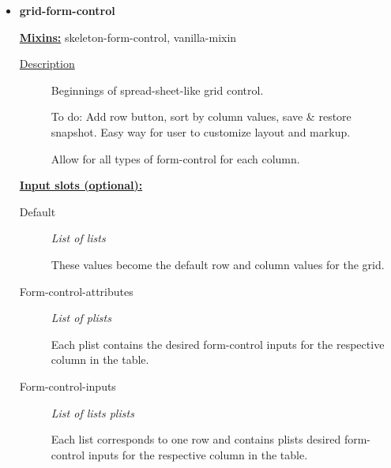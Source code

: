 \documentclass [11pt]{book}
\begin{document}
\begin{itemize}
\begin{description}
\end{description}







\item {}
\label{prim:grid-form-control}
\textbf{grid-form-control}


\textbf{
\underline{Mixins:}} skeleton-form-control, vanilla-mixin





\begin{description}

\item [
\underline{Description}]


Beginnings of spread-sheet-like 
grid control.

To do: Add row button, sort by column values, 
save & restore snapshot. Easy way for user to 
customize layout and markup.

Allow for all types of form-control for each column.





\end{description}








\textbf{
\underline{Input slots (optional):}}

\begin{description}

\item [Default]
\emph{List of lists}

 These values become the default row and column
values for the grid.




\item [Form-control-attributes]
\emph{List of plists}

 Each plist contains the desired form-control
inputs for the respective column in the table.




\item [Form-control-inputs]
\emph{List of lists plists}

 Each list corresponds to one row
and contains plists desired form-control inputs for the
respective column in the table.





\end{description}
\end{itemize}
\end{document}
